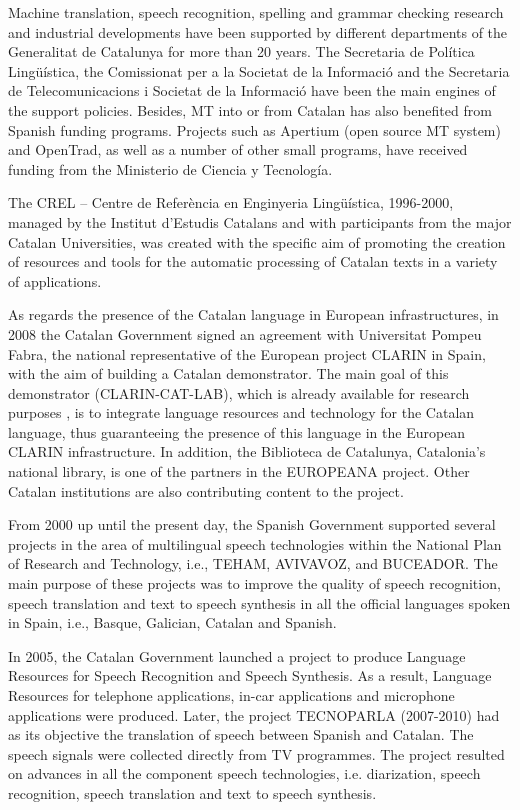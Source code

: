 \documentclass[]{../../metanetpaper}
\begin{document}
\begin{multicols}{2}
Machine translation, speech recognition, spelling and grammar checking research and industrial developments have been supported by different departments of the Generalitat de Catalunya for more than 20 years. The Secretaria de Política Lingüística, the Comissionat per a la Societat de la Informació and the Secretaria de Telecomunicacions i Societat de la Informació have been the main engines of the support policies. Besides, MT into or from Catalan has also benefited from Spanish funding programs. Projects such as Apertium (open source MT system) and OpenTrad, as well as a number of other small programs, have received funding from the Ministerio de Ciencia y Tecnología. 

The CREL – Centre de Referència en Enginyeria Lingüística, 1996-2000, managed by the Institut d’Estudis Catalans and with participants from the major Catalan Universities, was created with the specific aim of promoting the creation of resources and tools for the automatic processing of Catalan texts in a variety of applications. 

As regards the presence of the Catalan language in European infrastructures, in 2008 the Catalan Government signed an agreement with Universitat Pompeu Fabra, the national representative of the European project CLARIN in Spain, with the aim of building a Catalan demonstrator. The main goal of this demonstrator (CLARIN-CAT-LAB), which is already available for research purposes \cite{CAT-Nota30}, is to integrate language resources and technology for the Catalan language, thus guaranteeing the presence of this language in the European CLARIN infrastructure. In addition, the Biblioteca de Catalunya, Catalonia’s national library, is one of the partners in the EUROPEANA project. Other Catalan institutions are also contributing content to the project.

From 2000 up until the present day, the Spanish Government supported several projects in the area of multilingual speech technologies within the National Plan of Research and Technology, i.e., TEHAM, AVIVAVOZ, and BUCEADOR. The main purpose of these projects was to improve the quality of speech recognition, speech translation and text to speech synthesis in all the official languages spoken in Spain, i.e., Basque, Galician, Catalan and Spanish.

In 2005, the Catalan Government launched a project to produce Language Resources for Speech Recognition and Speech Synthesis. As a result, Language Resources for telephone applications, in-car applications and microphone applications were produced. Later, the project TECNOPARLA (2007-2010) had as its objective the translation of speech between Spanish and Catalan. The speech signals were collected directly from TV programmes. The project resulted on advances in all the component speech technologies, i.e.  diarization, speech recognition, speech translation and text to speech synthesis.
  

\end{multicols}
\end{document}

